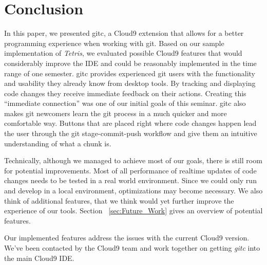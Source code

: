 \section{Conclusion}
\label{sec:Conclusion}

In this paper, we presented gitc, a Cloud9 extension that allows for a better programming experience when working with git. 
Based on our sample implementation of \textit{Tetris}, we evaluated possible Cloud9 features that would considerably improve the IDE and could be reasonably implemented in the time range of one semester.
gitc provides experienced git users with the functionality and usability they already know from desktop tools. 
By tracking and displaying code changes they receive immediate feedback on their actions. 
Creating this ``immediate connection'' was one of our initial goals of this seminar. 
gitc also makes git newcomers learn the git process in a much quicker and more comfortable way. Buttons that are placed right where code changes happen lead the user through the git stage-commit-push workflow and give them an intuitive understanding of what a chunk is.

Technically, although we managed to achieve most of our goals, there is still room for potential improvements. 
Most of all performance of realtime updates of code changes needs to be tested in a real world environment. 
Since we could only run and develop in a local environment, optimizations may become necessary. 
We also think of additional features, that we think would yet further improve the experience of our tools. 
Section ~\ref{sec:Future_Work} gives an overview of potential features.

Our implemented features address the issues with the current Cloud9 version. 
We've been contacted by the Cloud9 team and work together on getting \emph{gitc} into the main Cloud9 IDE.